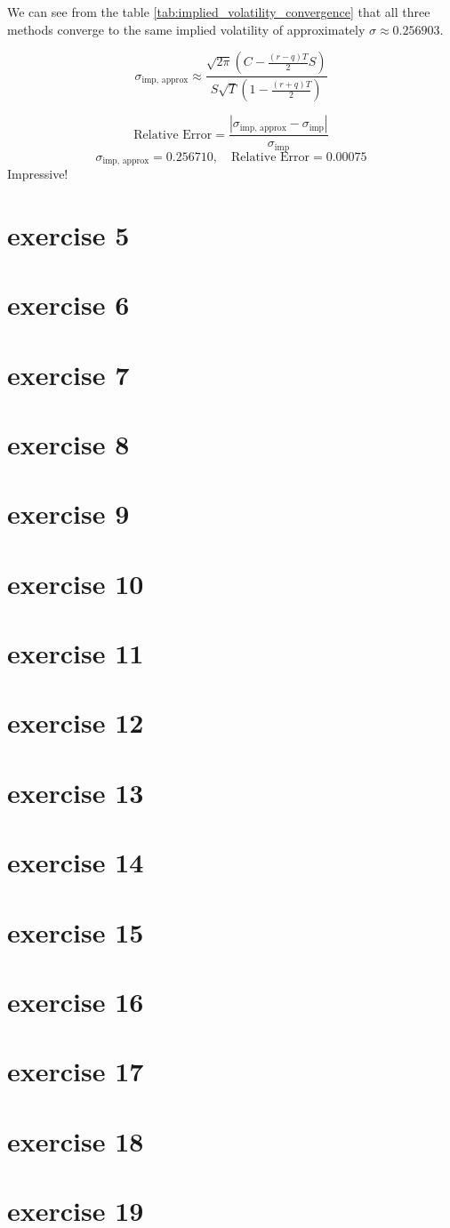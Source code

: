 \documentclass{article}
\begin{document}
We can see from the table \ref{tab:implied_volatility_convergence} that all three methods converge to the same implied volatility of approximately \( \sigma \approx 0.256903 \).

\[
    \sigma_{\text{imp, approx}} \approx
    \frac{ \sqrt{2\pi} \left( C - \frac{(r - q)T}{2} S \right) }
    { S \sqrt{T} \left( 1 - \frac{(r + q)T}{2} \right) }
\]

\[
    \text{Relative Error} =
    \frac{ \left| \sigma_{\text{imp, approx}} - \sigma_{\text{imp}} \right| }
    { \sigma_{\text{imp}} }
\]
\[
    \sigma_{\text{imp, approx}} = 0.256710, \quad
    \text{Relative Error} = 0.00075
\]
Impressive!

\section{exercise 5}
\section{exercise 6}
\section{exercise 7}
\section{exercise 8}
\section{exercise 9}
\section{exercise 10}
\section{exercise 11}
\section{exercise 12}
\section{exercise 13}
\section{exercise 14}
\section{exercise 15}
\section{exercise 16}
\section{exercise 17}
\section{exercise 18}
\section{exercise 19}
\end{document}
